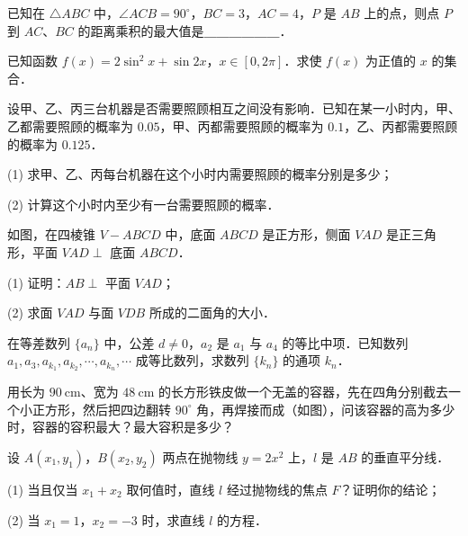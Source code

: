 \begin{question}
已知在 $\triangle ABC$ 中，$\angle ACB = 90^\circ$，$BC = 3$，$AC = 4$，$P$ 是 $AB$ 上的点，则点 $P$ 到 $AC$、$BC$ 的距离乘积的最大值是＿＿＿＿＿＿．

\end{question}
\begin{question}
已知函数 $f(x) = 2\sin^2 x + \sin 2x$，$x \in [0, 2\pi]$．求使 $f(x)$ 为正值的 $x$ 的集合．

\end{question}
\begin{question}
设甲、乙、丙三台机器是否需要照顾相互之间没有影响．已知在某一小时内，甲、乙都需要照顾的概率为 $0.05$，甲、丙都需要照顾的概率为 $0.1$，乙、丙都需要照顾的概率为 $0.125$．

(1) 求甲、乙、丙每台机器在这个小时内需要照顾的概率分别是多少；

(2) 计算这个小时内至少有一台需要照顾的概率．

\Needspace{0.4\textheight}
\end{question}
\begin{question}
如图，在四棱锥 $V - ABCD$ 中，底面 $ABCD$ 是正方形，侧面 $VAD$ 是正三角形，平面 $VAD \perp$ 底面 $ABCD$．

(1) 证明：$AB \perp$ 平面 $VAD$；

(2) 求面 $VAD$ 与面 $VDB$ 所成的二面角的大小．
\nopagebreak[4]
\begin{center}\end{center}
\nopagebreak[4]
\end{question}
\begin{question}
在等差数列 $\{a_n\}$ 中，公差 $d \neq 0$，$a_2$ 是 $a_1$ 与 $a_4$ 的等比中项．已知数列 $a_1, a_3, a_{k_1}, a_{k_2}, \cdots, a_{k_n}, \cdots$ 成等比数列，求数列 $\{k_n\}$ 的通项 $k_n$．

\Needspace{0.4\textheight}
\end{question}
\begin{question}
用长为 $90\ \mathrm{cm}$、宽为 $48\ \mathrm{cm}$ 的长方形铁皮做一个无盖的容器，先在四角分别截去一个小正方形，然后把四边翻转 $90^\circ$ 角，再焊接而成（如图），问该容器的高为多少时，容器的容积最大？最大容积是多少？
\nopagebreak[4]
\begin{center}\end{center}
\nopagebreak[4]
\end{question}
\begin{question}
设 $A(x_1, y_1)$，$B(x_2, y_2)$ 两点在抛物线 $y = 2x^2$ 上，$l$ 是 $AB$ 的垂直平分线．

(1) 当且仅当 $x_1 + x_2$ 取何值时，直线 $l$ 经过抛物线的焦点 $F$？证明你的结论；

(2) 当 $x_1 = 1$，$x_2 = -3$ 时，求直线 $l$ 的方程．

\end{question}